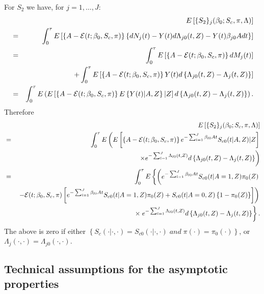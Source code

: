 \documentclass[11pt]{article}
\newcommand{\eqnn}{\begin{eqnarray*}}
\newcommand{\een}{\end{eqnarray*}}
\begin{document}
For $S_2$ we have, for $j=1,\ldots,J$:
\eqnn
&&E\left[\{{S}_{2}\}_j(\beta_0;  S_c, \pi, \Lambda)\right]\\
&=&\int_0^\tau  E \left[\left\{A -{\cal E}(t; \beta_0,  S_c,  \pi)\right\}\left\{dN_{j}(t)-Y(t)d  \Lambda_{j0}(t,Z )-Y(t)\beta_{j0}Adt\right\}\right]\\
&=&\int_0^\tau  E \left[\left\{A -{\cal E}(t; \beta_0,  S_c,  \pi)\right\}dM_{j}(t)\right]\\
&&+\int_0^\tau  E \left[\left\{A -{\cal E}(t; \beta_0,  S_c,  \pi)\right\}Y(t)d\left\{\Lambda_{j0}(t,Z)-  \Lambda_{j}(t,Z )\right\}\right]\\
&=&\int_0^\tau  E\left( E \left[\left\{A -{\cal E}(t; \beta_0,  S_c,  \pi)\right\}E \left\{Y(t)| A,Z\right\}| Z\right]d\left\{\Lambda_{j0}(t,Z)- \Lambda_{j}(t,Z)\right\}\right).
\een
Therefore
\eqnn
&&E\left[\{{S}_{2}\}_j(\beta_0;  S_c, \pi, \Lambda)\right]\\
&=&\int_0^\tau  E\left( E\left[\left\{A -{\cal E}(t; \beta_0,  S_c,  \pi)\right\}e^{-\sum_{l=1}^J\beta_{l0}At}S_{c0}(t | A,Z)| Z\right]\right.
\\
&&\left. \times e^{-\sum_{l=1}^J\Lambda_{l0}(t,Z)}d\left\{\Lambda_{j0}(t,Z)-  \Lambda_{j}(t,Z )\right\}\right)\\
&=&\int_0^\tau  E\left\{\left(e^{-\sum_{l=1}^J\beta_{l0}At}S_{c0}(t | A=1,Z)\pi_0(Z) \right.\right.
\\
&&\left.\left.-{\cal E}(t; \beta_0,  S_c,  \pi)\left[e^{-\sum_{l=1}^J\beta_{l0}At}S_{c0}(t | A=1,Z )\pi_0(Z)+S_{c0}(t | A=0,Z)\left\{1-\pi_0(Z)\right\}\right]\right)\right.
\\
&&\times\left.e^{-\sum_{l=1}^J\Lambda_{l0}(t,Z)}d\left\{\Lambda_{j0}(t,Z)- \Lambda_{j}(t,Z )\right\}\right\}.
\een
The above is zero if either 
$\left\{S_c\left(\cdot | \cdot,\cdot \right)= S_{c0}(\cdot| \cdot,\cdot)\;and\;\pi(\cdot)= \pi_0(\cdot)\right\}$, or
$\Lambda_{j}(\cdot,\cdot)=\Lambda_{j0}(\cdot,\cdot )$.














\newpage
\subsection{Technical assumptions for the asymptotic properties}\label{ass}
\end{document}
